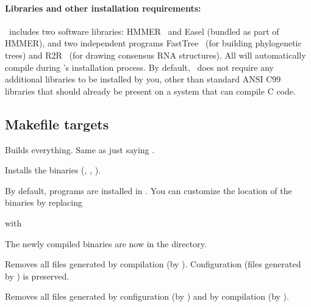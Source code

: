 \paragraph{Libraries and other installation requirements:} \rscape\ includes
two software libraries: HMMER~\citep{Eddy11} and Easel (bundled as
part of HMMER), and two independent programs FastTree~\citep{Price10}
(for building phylogenetic trees) and R2R~\citep{WeinbergBreaker11}
(for drawing consensus RNA structures). All will automatically compile
during \rscape's installation process.  By default, \rscape\ does not
require any additional libraries to be installed by you, other than
standard ANSI C99 libraries that should already be present on a system
that can compile C code.

\subsection{Makefile targets}

\begin{sreitems}{}

\item[\emprog{all}]
  Builds everything. Same as just saying .

\item[\emprog{install}] 
  Installs the binaries (, , ).

  By default, programs are installed in
  . 
  You can customize the location of the binaries by replacing
  
  
  with
  
  
  The newly compiled binaries are now in the
   directory.\\
  
\item[\emprog{clean}]
  Removes all files generated by compilation (by
  ). Configuration (files generated by
  ) is preserved.

\item[\emprog{distclean}]
  Removes all files generated by configuration (by )
  and by compilation (by ). 

\end{sreitems}


